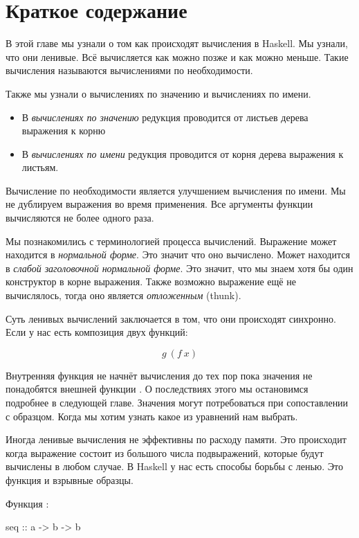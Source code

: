 \section{Краткое содержание}

В этой главе мы узнали о том как происходят вычисления
в Haskell. Мы узнали, что они ленивые. Всё вычисляется
как можно позже и как можно меньше. Такие вычисления
называются вычислениями по необходимости.

Также мы узнали о вычислениях по значению и вычислениях по имени.

\begin{itemize}
\item В \emph{вычислениях по значению} редукция проводится от 
        листьев дерева выражения к корню
\item В \emph{вычислениях по имени} редукция проводится от корня 
        дерева выражения к листьям.
\end{itemize}

Вычисление по необходимости является улучшением 
вычисления по имени. Мы не дублируем выражения
во время применения. Все аргументы функции вычисляются
не более одного раза.

Мы познакомились с терминологией процесса вычислений.
Выражение может находится в \emph{нормальной форме}. Это значит
что оно вычислено. Может находится в \emph{слабой заголовочной
нормальной форме}. Это значит, что мы знаем хотя бы один 
конструктор в корне выражения. Также возможно выражение 
ещё не вычислялось, тогда оно является \emph{отложенным} (thunk).

Суть ленивых вычислений заключается в том, что они
происходят синхронно. Если у нас есть 
композиция двух функций:

\[ g\ (f\ x) \]

Внутренняя функция  не начнёт вычисления до тех
пор пока значения не понадобятся внешней функции .
О последствиях этого мы остановимся подробнее в следующей главе.
Значения могут потребоваться при сопоставлении с образцом.
Когда мы хотим узнать какое из уравнений нам выбрать.

Иногда ленивые вычисления не эффективны по расходу памяти. 
Это происходит когда выражение состоит из большого числа
подвыражений, которые будут вычислены в любом случае.
В Haskell у нас есть способы борьбы с ленью. 
Это функция  и взрывные образцы. 

Функция :

\begin{code}
seq :: a -> b -> b
\end{code}

